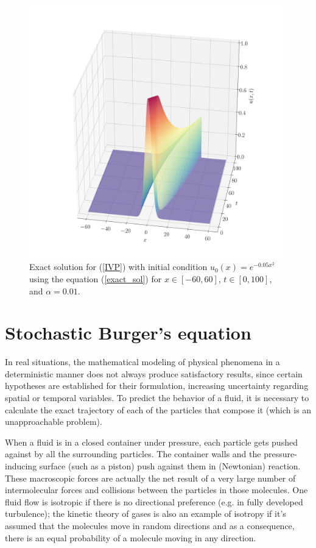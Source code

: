     \begin{figure}[H]
    	\centering
    	\includegraphics[width=11cm]{Figures/Galerkin/Graphics/eps=0.01/Exact_Solution_alpha=001.png}
    	\caption{Exact solution for (\ref{IVP}) with initial condition $u_0 (x) = e^{-0.05x^2}$ using the equation (\ref{exact_sol}) for $x \in [-60, 60]$, $t \in [0, 100]$, and $\alpha = 0.01$.}
    	\label{Exact_Solution_alpha=0.01}
    \end{figure}
 	
    \section{Stochastic Burger's equation}
     
    In real situations, the mathematical modeling of physical phenomena in a deterministic manner does not always produce satisfactory results, since certain hypotheses are established for their formulation, increasing uncertainty regarding spatial or temporal variables. To predict the behavior of a fluid, it is necessary to calculate the exact trajectory of each of the particles that compose it (which is an unapproachable problem). 
    
    When a fluid is in a closed container under pressure, each particle gets pushed against by all the surrounding particles. The container walls and the pressure-inducing surface (such as a piston) push against them in (Newtonian) reaction. These macroscopic forces are actually the net result of a very large number of intermolecular forces and collisions between the particles in those molecules. One fluid flow is isotropic if there is no directional preference (e.g. in fully developed turbulence); the kinetic theory of gases is also an example of isotropy if it's assumed that the molecules move in random directions and as a consequence, there is an equal probability of a molecule moving in any direction. 
    
